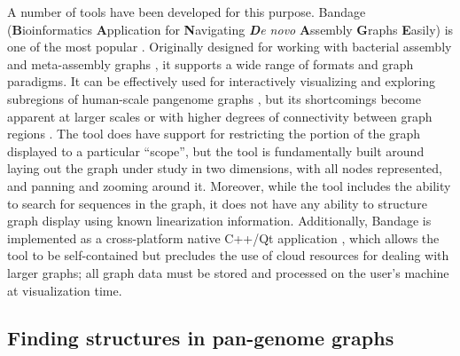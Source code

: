 A number of tools have been developed for this purpose.
Bandage (\textbf{B}ioinformatics \textbf{A}pplication for \textbf{N}avigating \textit{\textbf{D}e novo} \textbf{A}ssembly \textbf{G}raphs \textbf{E}asily) \citep{Wick_2015} is one of the most popular \citep{Mikheenko_2019}.
Originally designed for working with bacterial assembly and meta-assembly graphs \citep{Wick_2015}, it supports a wide range of formats and graph  paradigms. It can be effectively used for interactively visualizing and exploring subregions of human-scale pangenome graphs \citep{Garrison_2019}, but its shortcomings become apparent at larger scales or with higher degrees of connectivity between graph regions \citep{Mikheenko_2019}.
The tool does have support for restricting the portion of the graph displayed to a particular ``scope'', but the tool is fundamentally built around laying out the graph under study in two dimensions, with all nodes represented, and panning and zooming around it.
Moreover, while the tool includes the ability to search for sequences in the graph, it does not have any ability to structure graph display using known linearization information.
Additionally, Bandage is implemented as a cross-platform native C++/Qt application \citep{Wick_2015}, which allows the tool to be self-contained but precludes the use of cloud resources for dealing with larger graphs; all graph data must be stored and processed on the user's machine at visualization time.





\subsection{Finding structures in pan-genome graphs}

